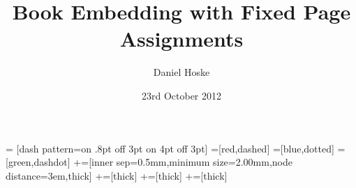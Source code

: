 
\author{Daniel Hoske}
\title{Book Embedding with Fixed Page Assignments}
\date{23rd October 2012}


\newcommand{\SEFE}{\prob{sefe}}
\newcommand{\SEFECON}{\prob{connected-sefe}}
\newcommand{\PQ}{PQ\xspace}
\newcommand{\Q}{Q\xspace}
\newcommand{\PT}{P\xspace}

\newcommand{\prob}[1]{\textsc{#1}\xspace}
\newcommand{\probTwoSat}{\prob{2-sat}}
\newcommand{\probThreeSat}{\prob{3-sat}}
\newcommand{\probQTree}{\prob{q-tree-book-embedding}}
\newcommand{\probPTree}{\prob{p-tree-book-embedding}}
\newcommand{\probQTreeSat}{\prob{q-tree-2-sat}}
\newcommand{\probBookNormal}{\prob{not-fixed-book-embedding}}
\newcommand{\probBook}{\prob{book-embedding}}
\newcommand{\probBookConnected}{\prob{connected-book-embedding}}
\newcommand{\probBetween}{\prob{betweenness}}
\newcommand{\probBookOrder}{\prob{order-book-embedding}}
\newcommand{\probMatching}{\prob{perfect-matchings-book-embedding}}
\newcommand{\probNotMatching}{\prob{matchings-book-embedding}}
\newcommand{\probPQ}{\prob{simultaneous-pq-ordering}}
\newcommand{\probMul}{\prob{multiple-spine-embedding}}
\newcommand{\probThreeMatching}{\prob{3-perfect-matchings-book-embedding}}
\newcommand{\range}[1]{\{1, \dotsc, #1\}}
\newcommand{\newProb}[3]{%

\vspace{.5em}
\begin{block}{Problem: #1}
\emph{Given:} #2\\%
\emph{Question:} #3%
\end{block}
\vspace{.5em}
}    

 = [dash pattern=on .8pt off 3pt on 4pt off 3pt]
=[red,dashed]
=[blue,dotted]
=[green,dashdot]
+=[inner sep=0.5mm,minimum size=2.00mm,node distance=3em,thick]
+=[thick]
+=[thick]
+=[thick]
\usetikzlibrary{svg.path,calc,decorations.pathreplacing,positioning,backgrounds}
\newdimen\XCoord
\newdimen\YCoord
\newcommand*{\ExtractCoordinate}[1]{\path #1; \pgfgetlastxy{\XCoord}{\YCoord};}%

